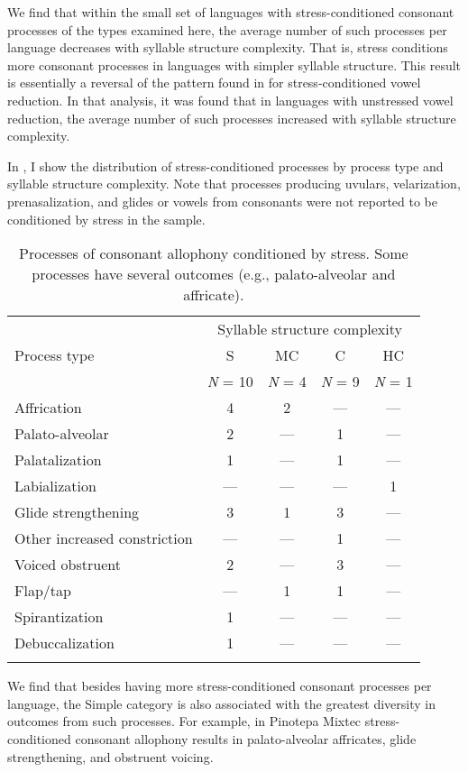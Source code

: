   We find that within the small set of languages with stress-conditioned consonant processes of the types examined here, the average number of such processes per language decreases with syllable structure complexity. That is, stress conditions more consonant processes in languages with simpler syllable structure. This result is essentially a reversal of the pattern found in  for stress-conditioned vowel reduction. In that analysis, it was found that in languages with unstressed vowel reduction, the average number of such processes increased with syllable structure complexity.

  In , I show the distribution of stress-conditioned processes by process type and syllable structure complexity. Note that processes producing uvulars, velarization, prenasalization, and glides or vowels from consonants were not reported to be conditioned by stress in the sample.

\begin{table}
\begin{tabular}{lcccc}
\lsptoprule
 & \multicolumn{4}{c}{Syllable structure complexity}\\\cmidrule(lr){2-5}
 Process type & S & MC & C & HC\\
             & \textit{N} = 10 & \textit{N} = 4 & \textit{N} = 9 & \textit{N} = 1\\\midrule
 Affrication & 4 & 2 & — & —\\
 Palato-alveolar & 2 & — & 1 & —\\
 Palatalization & 1 & — & 1 & —\\
 Labialization & — & — & — & 1\\
 Glide strengthening & 3 & 1 & 3 & —\\
 Other increased constriction & — & — & 1 & —\\
 Voiced obstruent & 2 & — & 3 & —\\
 Flap/tap & — & 1 & 1 & —\\
 Spirantization & 1 & — & — & —\\
 Debuccalization & 1 & — & — & —\\
\lspbottomrule
\end{tabular}
\caption{\label{tab:7.9}Processes of consonant allophony conditioned by stress. Some processes have several outcomes (e.g., palato-alveolar and affricate).}
\end{table}

  We find that besides having more stress-conditioned consonant processes per language, the Simple category is also associated with the greatest diversity in outcomes from such processes. For example, in Pinotepa Mixtec stress-conditioned consonant allophony results in palato-alveolar affricates, glide strengthening, and obstruent voicing.


